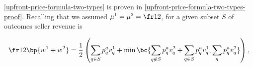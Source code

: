         


    
    




\cref{upfront-price-formula-two-types} is proven in \cref{upfront-price-formula-two-types-proof}. Recalling that we assumed $\mu^1 = \mu^2 = \fr12$, for a given subset $S$ of outcomes seller revenue is

\begin{equation} \label{revenue-formula-two-types}
\fr12 \bp{w^1 + w^2} = \frac{1}{2} \left( \sum_{q \in S} p^a_q v^1_q + \min \bc{\sum_{q\notin S} p^a_q v^2_q + \sum_{q\in S} p^a_q v^1_q, \sum_q p^a_q v^2_q} \right),
\end{equation}

